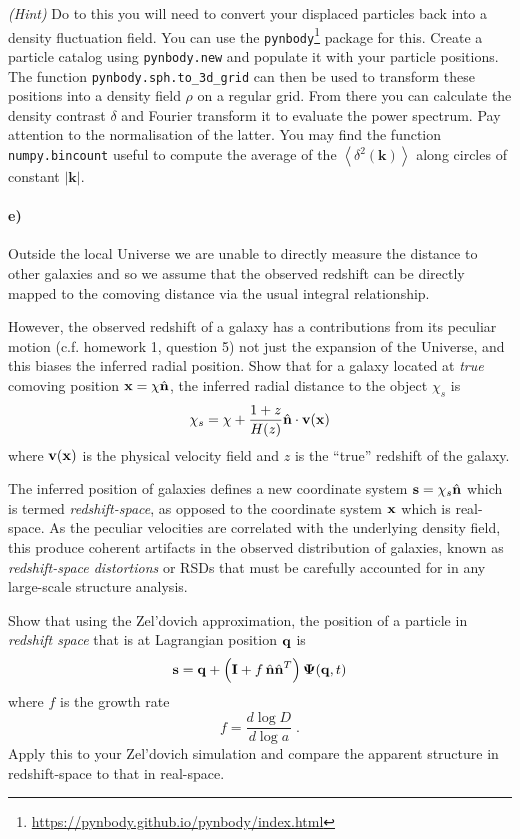 \documentclass[12pt]{article}
\begin{document}
\emph{(Hint)} Do to this you will need to convert your displaced particles back
into a density fluctuation field. You can use the
\texttt{pynbody}\footnote{\url{https://pynbody.github.io/pynbody/index.html}}
package for this. Create a particle catalog using \texttt{pynbody.new} and
populate it with your particle positions. The function
\texttt{pynbody.sph.to\_3d\_grid} can then be used to transform these positions
into a density field $\rho$ on a regular grid. From there you can calculate the
density contrast $\delta$ and Fourier transform it to evaluate the power
spectrum. Pay attention to the normalisation of the latter. You may find the
function \texttt{numpy.bincount} useful to compute the average of the
$\left<\delta^2(\mathbf{k})\right>$ along circles of constant
$\left|\mathbf{k}\right|$.

\paragraph{e)} Outside the local Universe we are unable to directly measure the distance to other galaxies and so we assume that the observed redshift can be directly mapped to the comoving distance via the usual integral relationship.

However, the observed redshift of a galaxy has a contributions from its peculiar motion (c.f. homework 1, question 5) not just the expansion of the Universe, and this biases the inferred radial position. Show that for a galaxy located at \emph{true} comoving position ${\boldsymbol{\mathbf{x}}} = \chi \hat{{\boldsymbol{\mathbf{n}}}}$, the inferred radial distance to the object $\chi_s$ is
\begin{equation}
    \chi_s = \chi + \frac{1 + z}{H(z)}\hat{{\boldsymbol{\mathbf{n}}}} \cdot {\boldsymbol{\mathbf{v}}}({\boldsymbol{\mathbf{x}}})
\end{equation}
where ${\boldsymbol{\mathbf{v}}}({\boldsymbol{\mathbf{x}}})$ is the physical velocity field and $z$ is the ``true'' redshift of the galaxy.

The inferred position of galaxies defines a new coordinate system ${\boldsymbol{\mathbf{s}}} = \chi_s \hat{{\boldsymbol{\mathbf{n}}}}$ which is termed \emph{redshift-space}, as opposed to the coordinate system ${\boldsymbol{\mathbf{x}}}$ which is real-space. As the peculiar velocities are correlated with the underlying density field, this produce coherent artifacts in the observed distribution of galaxies, known as \emph{redshift-space distortions} or RSDs that must be carefully accounted for in any large-scale structure analysis.

Show that using the Zel'dovich approximation, the position of a particle in \emph{redshift space} that is at Lagrangian position ${\boldsymbol{\mathbf{q}}}$ is
\begin{equation}
{\boldsymbol{\mathbf{s}}} = {\boldsymbol{\mathbf{q}}} + \left(\mathbf{I} + f \, \hat{{\boldsymbol{\mathbf{n}}}} \hat{{\boldsymbol{\mathbf{n}}}}^T\right) \mathbf{\Psi}({\boldsymbol{\mathbf{q}}}, t)
\end{equation}
where $f$ is the growth rate
\begin{equation}
f = \frac{d \log D}{d \log a} \; .
\end{equation}
Apply this to your Zel'dovich simulation and compare the apparent structure in redshift-space to that in real-space.
\end{document}
